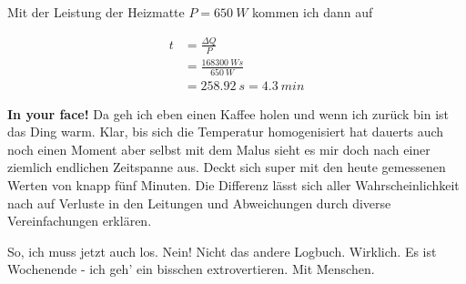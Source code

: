Mit der Leistung der Heizmatte \(P = \SI{650}{W}\) kommen ich dann auf

\begin{align}
    t   &= \frac{\Delta Q}{P} \nonumber\\
        &= \frac{\SI{168300}{Ws}}{\SI{650}{W}} \nonumber \\
        &= \SI{258,92}{s} = \SI{4,3}{min}
\end{align}

\textbf{In your face!} Da geh ich eben einen Kaffee holen und wenn ich zurück bin ist das Ding warm. Klar, bis sich die Temperatur
homogenisiert hat dauerts auch noch einen Moment aber selbst mit dem Malus sieht es mir doch nach einer ziemlich endlichen
Zeitspanne aus. Deckt sich super mit den heute gemessenen Werten von knapp fünf Minuten. Die Differenz
lässt sich aller Wahrscheinlichkeit nach auf Verluste in den Leitungen und Abweichungen durch diverse Vereinfachungen
erklären.\par\medskip
So, ich muss jetzt auch los. Nein! Nicht das andere Logbuch. Wirklich. Es ist Wochenende - ich geh' ein bisschen
extrovertieren. Mit Menschen.